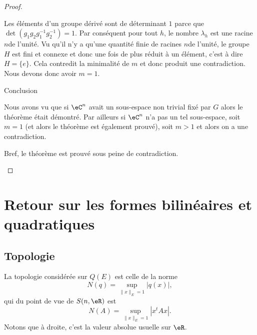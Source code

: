 \begin{proof}
\begin{subproof}
        Les éléments d'un groupe dérivé sont de déterminant \( 1\) parce que \( \det(g_1g_2g_1^{-1}g_2^{-1})=1\). Par conséquent pour tout \( h\), le nombre \( \lambda_h\) est une racine \( n\)\ieme de l'unité. Vu qu'il n'y a qu'une quantité finie de racines \( n\)\ieme de l'unité, le groupe \( H\) est fini et connexe et donc une fois de plus réduit à un élément, c'est à dire \( H=\{ e \}\). Cela contredit la minimalité de \( m\) et donc produit une contradiction. Nous devons donc avoir \( m=1\).

    \item[Conclusion]

        Nous avons vu que si \( \eC^n\) avait un sous-espace non trivial fixé par \( G\) alors le théorème était démontré. Par ailleurs si \( \eC^n\) n'a pas un tel sous-espace, soit \( m=1\) (et alors le théorème est également prouvé), soit \( m>1\) et alors on a une contradiction.

        Bref, le théorème est prouvé sous peine de contradiction.
    \end{subproof}
\end{proof}

\section{Retour sur les formes bilinéaires et quadratiques}

\subsection{Topologie}

La topologie considérée sur \( Q(E)\) est celle de la norme
\begin{equation}    \label{EqZYBooZysmVh}
    N(q)=\sup_{\| x \|_E=1}| q(x) |,
\end{equation}
qui du point de vue de \( S(n,\eR)\) est
\begin{equation}    \label{EQooJETQooIjxRWu}
    N(A)=\sup_{\| x \|_E=1}| x^tAx |.
\end{equation}
Notons que à droite, c'est la valeur absolue usuelle sur \( \eR\).

